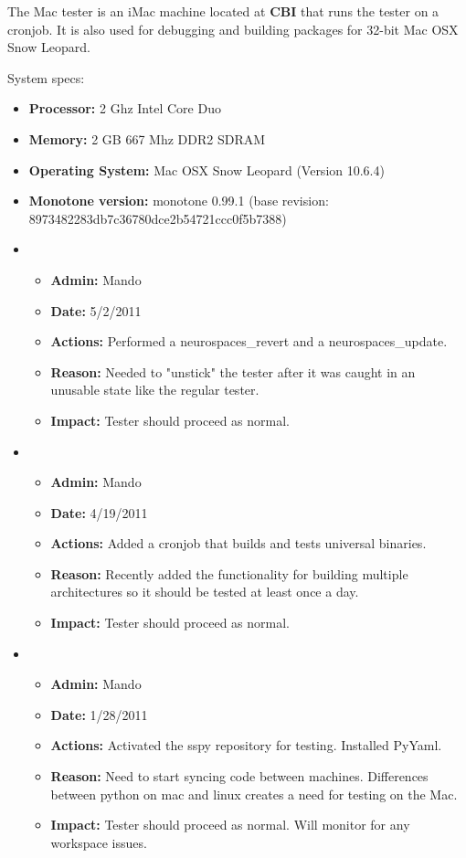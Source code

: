 \documentclass[12pt]{article}
\begin{document}
The Mac tester is an iMac machine located at {\bf CBI} that runs the tester on a cronjob. It is also used for debugging and building packages for 32-bit Mac OSX Snow Leopard.

System specs:
\begin{itemize}
\item[] {\bf Processor:} 2 Ghz Intel Core Duo
\item[] {\bf Memory:} 2 GB 667 Mhz DDR2 SDRAM
\item[] {\bf Operating System:} Mac OSX Snow Leopard (Version 10.6.4) 
\item[] {\bf Monotone version:} monotone 0.99.1 (base revision: 8973482283db7c36780dce2b54721ccc0f5b7388)
\end{itemize}

\begin{itemize}

\item
\begin{itemize}
\item[] {\bf Admin:} Mando
\item[] {\bf Date:} 5/2/2011 
\item[] {\bf Actions:}  Performed a neurospaces\_revert and a neurospaces\_update.
\item[] {\bf Reason:} Needed to "unstick" the tester after it was caught in an unusable state like the regular tester.
\item[] {\bf Impact:}  Tester should proceed as normal. 
\end{itemize}

\item
\begin{itemize}
\item[] {\bf Admin:} Mando
\item[] {\bf Date:} 4/19/2011 
\item[] {\bf Actions:}  Added a cronjob that builds and tests universal binaries.
\item[] {\bf Reason:} Recently added the functionality for building multiple architectures so it should be tested at least once a day.
\item[] {\bf Impact:}  Tester should proceed as normal. 
\end{itemize}

\item
\begin{itemize}
\item[] {\bf Admin:} Mando
\item[] {\bf Date:} 1/28/2011 
\item[] {\bf Actions:}  Activated the sspy repository for testing. Installed PyYaml.
\item[] {\bf Reason:} Need to start syncing code between machines. Differences between python on mac and linux creates a need for testing on the Mac. 
\item[] {\bf Impact:}  Tester should proceed as normal. Will monitor for any workspace issues.
\end{itemize}


\end{itemize}
\end{document}
